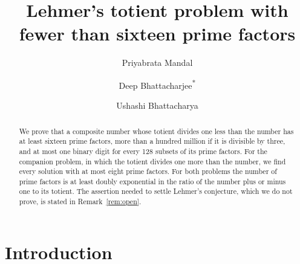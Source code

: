 \documentclass[11pt,reqno]{amsart}
\title[Lehmer's totient problem]
{Lehmer's totient problem with fewer than sixteen prime factors}
\author[P. Mandal]{Priyabrata Mandal}
\author[D. Bhattacharjee]{Deep Bhattacharjee\textsuperscript{*}}
\author[U. Bhattacharya]{Ushashi Bhattacharya}
\date{}
\numberwithin{equation}{section}
\theoremstyle{plain}
\theoremstyle{definition}
\theoremstyle{remark}
\begin{document}
\begin{abstract}
We prove that a composite number whose totient divides one less than
the number has at least sixteen prime factors, more than a hundred
million if it is divisible by three, and at most one binary digit for
every 128 subsets of its prime factors. For the companion problem, in
which the totient divides one more than the number, we find every
solution with at most eight prime factors. For both problems the number
of prime factors is at least doubly exponential in the ratio of the
number plus or minus one to its totient. The assertion needed to
settle Lehmer's conjecture, which we do not prove, is stated in
Remark~\ref*{rem:open}.
\end{abstract}

\maketitle

\section{Introduction}\label{sec:intro}
\end{document}
